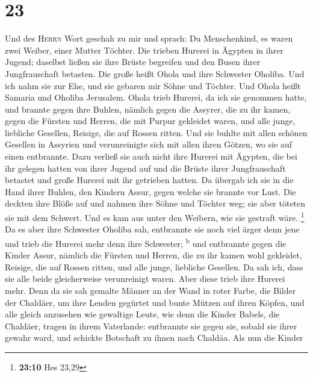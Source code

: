 \hypertarget{section-22}{%
\section{23}\label{section-22}}

 Und des \textsc{Herrn} Wort geschah zu mir und sprach:
 Du Menschenkind, es waren zwei Weiber, einer Mutter
Töchter.  Die trieben Hurerei in Ägypten in ihrer Jugend;
daselbst ließen sie ihre Brüste begreifen und den Busen ihrer
Jungfrauschaft betasten.  Die große heißt Ohola und ihre
Schwester Oholiba. Und ich nahm sie zur Ehe, und sie gebaren mir Söhne
und Töchter. Und Ohola heißt Samaria und Oholiba Jerusalem.
 Ohola trieb Hurerei, da ich sie genommen hatte, und
brannte gegen ihre Buhlen, nämlich gegen die Assyrer, die zu ihr kamen,
 gegen die Fürsten und Herren, die mit Purpur gekleidet
waren, und alle junge, liebliche Gesellen, Reisige, die auf Rossen
ritten.  Und sie buhlte mit allen schönen Gesellen in
Assyrien und verunreinigte sich mit allen ihren Götzen, wo sie auf einen
entbrannte.  Dazu verließ sie auch nicht ihre Hurerei mit
Ägypten, die bei ihr gelegen hatten von ihrer Jugend auf und die Brüste
ihrer Jungfrauschaft betastet und große Hurerei mit ihr getrieben
hatten.  Da übergab ich sie in die Hand ihrer Buhlen, den
Kindern Assur, gegen welche sie brannte vor Lust.  Die
deckten ihre Blöße auf und nahmen ihre Söhne und Töchter weg; sie aber
töteten sie mit dem Schwert. Und es kam aus unter den Weibern, wie sie
gestraft wäre. \footnote{\textbf{23:10} Hes 23,29}  Da es
aber ihre Schwester Oholiba sah, entbrannte sie noch viel ärger denn
jene und trieb die Hurerei mehr denn ihre Schwester; \textsuperscript{b}
 und entbrannte gegen die Kinder Assur, nämlich die
Fürsten und Herren, die zu ihr kamen wohl gekleidet, Reisige, die auf
Rossen ritten, und alle junge, liebliche Gesellen.  Da
sah ich, dass sie alle beide gleicherweise verunreinigt waren.
 Aber diese trieb ihre Hurerei mehr. Denn da sie sah
gemalte Männer an der Wand in roter Farbe, die Bilder der Chaldäer,
 um ihre Lenden gegürtet und bunte Mützen auf ihren
Köpfen, und alle gleich anzusehen wie gewaltige Leute, wie denn die
Kinder Babels, die Chaldäer, tragen in ihrem Vaterlande: 
entbrannte sie gegen sie, sobald sie ihrer gewahr ward, und schickte
Botschaft zu ihnen nach Chaldäa.  Als nun die Kinder
